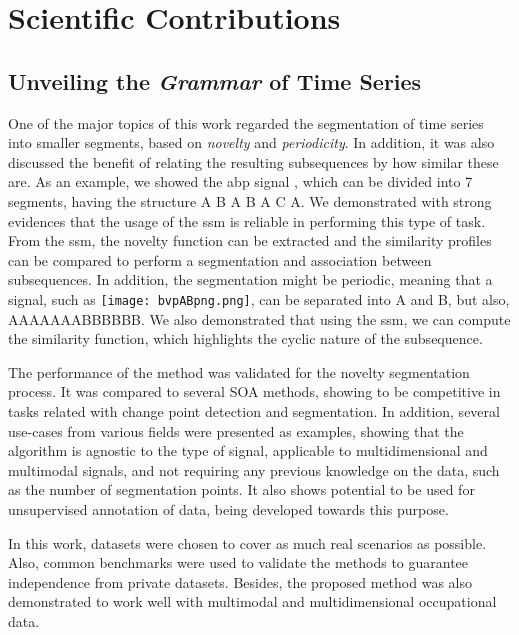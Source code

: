 \section{Scientific Contributions}

\subsection{Unveiling the \textit{Grammar} of Time Series}

One of the major topics of this work regarded the segmentation of time series into smaller segments, based on \textit{novelty} and \textit{periodicity}. In addition, it was also discussed the benefit of relating the resulting subsequences by how similar these are. As an example, we showed the \gls{abp} signal , which can be divided into 7 segments, having the structure \textcolor{mygreen3}{A} \textcolor{mymagenta}{B} \textcolor{mygreen3}{A} \textcolor{mymagenta}{B} \textcolor{mygreen3}{A} \textcolor{myblue5}{C} \textcolor{mygreen3}{A}. We demonstrated with strong evidences that the usage of the \gls{ssm} is reliable in performing this type of task. From the \gls{ssm}, the novelty function can be extracted and the similarity profiles can be compared to perform a segmentation and association between subsequences. In addition, the segmentation might be periodic, meaning that a signal, such as \texttt{[image: bvpABpng.png]}, can be separated into \textcolor{myblue}{A} and \textcolor{mygreen}{B}, but also, \textcolor{myblue}{AAAAAAA}\textcolor{mygreen}{BBBBBB}. We also demonstrated that using the \gls{ssm}, we can compute the similarity function, which highlights the cyclic nature of the subsequence.
\par
The performance of the method was validated for the novelty segmentation  process. It was compared to several SOA methods, showing to be competitive in tasks related with change point detection and segmentation. In addition, several use-cases from various fields were presented as examples, showing that the algorithm is agnostic to the type of signal, applicable to multidimensional and multimodal signals, and not requiring any previous knowledge on the data, such as the number of segmentation points. It also shows potential to be used for unsupervised annotation of data, being developed towards this purpose.
\par
In this work, datasets were chosen to cover as much real scenarios as possible. Also, common benchmarks were used to validate the methods to guarantee independence from private datasets. Besides, the proposed method was also demonstrated to work well with multimodal and multidimensional occupational data.
